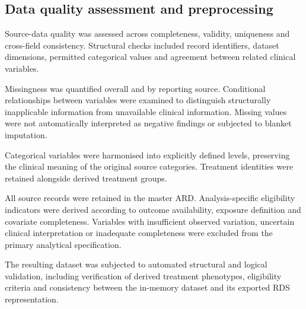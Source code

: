 \documentclass[
  british,
]{article}
\begin{document}
\subsection{Data quality assessment and
preprocessing}\label{data-quality-assessment-and-preprocessing}

Source-data quality was assessed across completeness, validity,
uniqueness and cross-field consistency. Structural checks included
record identifiers, dataset dimensions, permitted categorical values and
agreement between related clinical variables.

Missingness was quantified overall and by reporting source. Conditional
relationships between variables were examined to distinguish
structurally inapplicable information from unavailable clinical
information. Missing values were not automatically interpreted as
negative findings or subjected to blanket imputation.

Categorical variables were harmonised into explicitly defined levels,
preserving the clinical meaning of the original source categories.
Treatment identities were retained alongside derived treatment groups.

All source records were retained in the master ARD. Analysis-specific
eligibility indicators were derived according to outcome availability,
exposure definition and covariate completeness. Variables with
insufficient observed variation, uncertain clinical interpretation or
inadequate completeness were excluded from the primary analytical
specification.

The resulting dataset was subjected to automated structural and logical
validation, including verification of derived treatment phenotypes,
eligibility criteria and consistency between the in-memory dataset and
its exported RDS representation.
\end{document}
